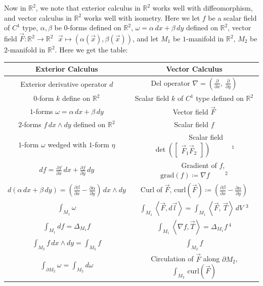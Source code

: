 \documentclass[15pt]{book}
\theoremstyle{break}
\theoremstyle{break}
\newcommand{\R}{\mathbb{R}}
\newcommand{\pd}{\partial}
\newcommand{\lr}[1]{\left(#1\right)}
\newcommand{\bmat}[1]{\begin{bmatrix} #1 \end{bmatrix}}
\begin{document}
Now in $\R^2$, we note that exterior calculus in $\R^2$ works well with diffeomorphism, and vector calculus in $\R^2$ works well with isometry. Here we let $f$ be a scalar field of $C^1$ type, $\alpha,\beta$ be $0$-forms defined on $\R^2$, $\omega = \alpha\, dx + \beta\, dy$ defined on $\R^2$, vector field $\vec{F}:\R^2 \to \R^2 \ \ \ \vec{x}\mapsto (\alpha(\vec{x}), \beta(\vec{x}))$, and let $M_1$ be $1$-manifold in $\R^2$, $M_2$ be $2$-manifold in $\R^2$. Here we get the table:

\begin{center}
\begin{tabular}{|c|c|}
\hline
\cellcolor{orange!29} Exterior Calculus & \cellcolor{blue!29} Vector Calculus \\
\hline
Exterior derivative operator $d$ & Del operator $\nabla = \left(\frac{\partial}{\partial x}, \ \frac{\partial }{\partial y}\right)$\\
\hline
$0$-form $k$ define on $\R^2$ & Scalar field $k$ of $C^1$ type defined on $\R^2$ \\
\hline
$1$-forms $\omega = \alpha \, dx + \beta \, dy$ & Vector field $\vec{F}$ \\
\hline
$2$-forms $f\,dx \wedge dy$ defined on $\R^2$ & Scalar field $f$\\
\hline
$1$-form $\omega$ wedged with $1$-form $\eta$ & ${}\qquad\quad$ Scalar field $\det\left(\bmat{\vec{F}_1 \vec{F}_2}\right) \qquad\quad   {}^1$ \\
\hline
$df = \frac{\pd f}{\pd x}\, dx + \frac{\pd f}{\pd y}\, dy$ & ${}\, \qquad$ Gradient of $f$, $\text{grad}(f) \coloneqq \nabla f \qquad\, {}^2$ \\
\hline
$d(\alpha\, dx + \beta \, dy) = \lr{\frac{\pd \beta}{\pd x} - \frac{\pd \alpha }{\pd y}}\, dx\wedge dy$ & Curl of $\vec{F}$, $\text{curl}(\vec{F}) \coloneqq \lr{\frac{\pd \beta}{\pd x} - \frac{\pd \alpha}{\pd y}}$\\
\hline
$\int_{M_1} \omega$ &  \qquad$\int_{M_1} \left<\vec{F}, d\vec{l} \right> = \int_{M_1} \left< \vec{F},\, \vec{T}\right> \, dV$ \qquad${}^3$\\
\hline
$\int_{M_1}df = \Delta_{M_1} f$ &\qquad\qquad $\int_{M_1}\left< \nabla f, \vec{T}\right> = \Delta_{M_1} f$\,\qquad\qquad${}^4$\\
\hline
$\int_{M_2} f\, dx \wedge dy = \int_{M_2} f$ & $\int_{M_2} f$\\
\hline
$\int_{\pd {M_2}}\omega = \int_{M_2} d\omega$ & Circulation of $\vec{F}$ along $\pd M_2$, $\int_{M_2} \, \text{curl}(\vec{F})$\\
\hline
\end{tabular}
\end{center}
\end{document}
